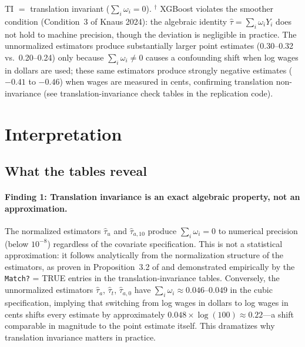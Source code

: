 \documentclass[12pt, a4paper]{article}
\begin{document}
\begin{table}[ht]
\noindent\footnotesize
TI $=$ translation invariant ($\sum_i \omega_i = 0$). $^{\dagger}$ XGBoost
violates the smoother condition (Condition~3 of Knaus 2024): the algebraic
identity $\hat{\tau} = \sum_i \omega_i Y_i$ does not hold to machine
precision, though the deviation is negligible in practice. The unnormalized
estimators produce substantially larger point estimates (0.30--0.32 vs.\
0.20--0.24) only because $\sum_i \omega_i \neq 0$ causes a confounding shift
when log wages in dollars are used; these same estimators produce strongly
negative estimates ($-0.41$ to $-0.46$) when wages are measured in cents,
confirming translation non-invariance (see translation-invariance check
tables in the replication code).
\end{table}

\clearpage
\section*{Interpretation}

\subsection*{What the tables reveal}

\paragraph{Finding 1: Translation invariance is an exact algebraic property,
not an approximation.}
The normalized estimators $\hat{\tau}_u$ and $\hat{\tau}_{a,10}$ produce
$\sum_i \omega_i = 0$ to numerical precision (below $10^{-8}$) regardless of
the covariate specification. This is not a statistical approximation: it
follows analytically from the normalization structure of the estimators, as
proven in Proposition~3.2 of \citet{sloczyn2025kappa} and demonstrated
empirically by the \texttt{Match?} = TRUE entries in the translation-invariance
tables. Conversely, the unnormalized estimators $\hat{\tau}_a$, $\hat{\tau}_t$,
$\hat{\tau}_{a,0}$ have $\sum_i \omega_i \approx 0.046$--$0.049$ in the cubic
specification, implying that switching from log wages in dollars to log wages
in cents shifts every estimate by approximately
$0.048 \times \log(100) \approx 0.22$---a shift comparable in magnitude to
the point estimate itself. This dramatizes why translation invariance matters
in practice.
\end{document}
